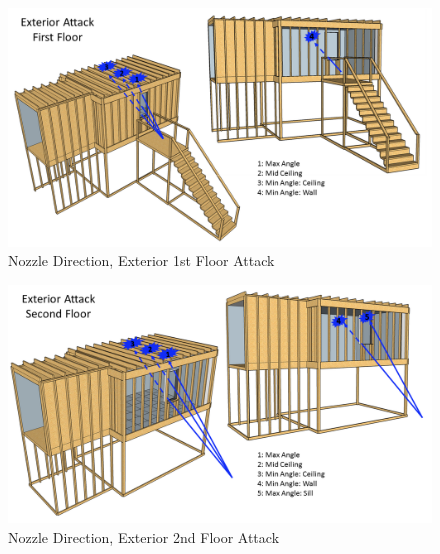 \documentclass{article}
\begin{document}
\begin{figure}[!ht]
	\centering
	\includegraphics[width=6in]{Figures/Water_Distribution/Nozzle_Position_ExtFirstfloor.png}
	\caption{Nozzle Direction, Exterior 1st Floor Attack}
	\label{fig:Nozzle_Direction_Exterior_1st_Floor_Attack}
\end{figure}

\begin{figure}[!ht]
	\centering
	\includegraphics[width=6in]{Figures/Water_Distribution/Nozzle_Position_ExtSecondfloor.png}
	\caption{Nozzle Direction, Exterior 2nd Floor Attack}
	\label{fig:Nozzle_Direction_Exterior_2nd_Floor_Attack}
\end{figure}

\clearpage
\end{document}

